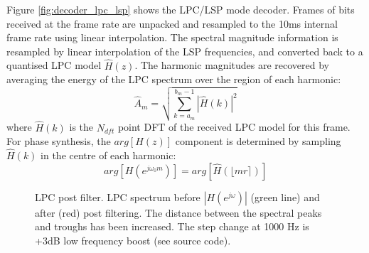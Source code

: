 \documentclass{article}
\begin{document}
{\begin{figure}[H]
\begin{center}
\end{center}
\end{figure}

Figure \ref{fig:decoder_lpc_lsp} shows the LPC/LSP mode decoder.  Frames of bits received at the frame rate are unpacked and resampled to the 10ms internal frame rate using linear interpolation.  The spectral magnitude information is resampled by linear interpolation of the LSP frequencies, and converted back to a quantised LPC model $\hat{H}(z)$.  The harmonic magnitudes are recovered by averaging the energy of the LPC spectrum over the region of each harmonic:
\begin{equation}
\hat{A}_m = \sqrt{ \sum_{k=a_m}^{b_m-1} | \hat{H}(k) |^2 }
\end{equation}
where $\hat{H}(k)$ is the $N_{dft}$ point DFT of the received LPC model for this frame.  For phase synthesis, the $arg[H(z)]$ component is determined by sampling $\hat{H}(k)$ in the centre of each harmonic:
\begin{equation}
arg \left[ H(e^{j \omega_0 m}) \right] = arg \left[ \hat{H}(\lfloor m r \rceil) \right]
\end{equation}

\begin{figure} [h]
\caption{LPC post filter.  LPC spectrum before $|H(e^{j \omega})|$ (green line) and after (red) post filtering. The distance between the spectral peaks and troughs has been increased.  The step change at 1000 Hz is +3dB low frequency boost (see source code).}
\label{fig:hts2a_lpc_pf}
\begin{center}

\end{center}
\end{figure}

}
\end{document}
